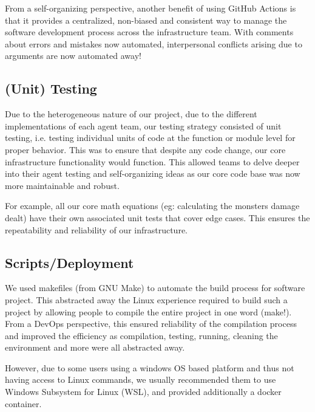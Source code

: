 From a self-organizing perspective, another benefit of using GitHub Actions is that it provides a centralized, non-biased and consistent way to manage the software development process across the infrastructure team. With comments about errors and mistakes now automated, interpersonal conflicts arising due to arguments are now automated away!



\subsection{(Unit) Testing}

Due to the heterogeneous nature of our project, due to the different implementations of each agent team, our testing strategy consisted of unit testing, i.e. testing individual units of code at the function or module level for proper behavior. This was to ensure that despite any code change, our core infrastructure functionality would function. This allowed teams to delve deeper into their agent testing and self-organizing ideas as our core code base was now more maintainable and robust.

For example, all our core math equations (eg: calculating the monsters damage dealt) have their own associated unit tests that cover edge cases. This ensures the repeatability and reliability of our infrastructure. 


\subsection{Scripts/Deployment}

We used makefiles (from GNU Make) to automate the build process for software project. This abstracted away the Linux experience required to build such a project by allowing people to compile the entire project in one word (make!). From a DevOps perspective, this ensured reliability of the compilation process  and improved the efficiency as compilation, testing, running, cleaning the environment and more were all abstracted away.  

However, due to some users using a windows OS based platform and thus not having access to Linux commands, we usually recommended them to use Windows Subsystem for Linux (WSL), and provided additionally a docker container. 

